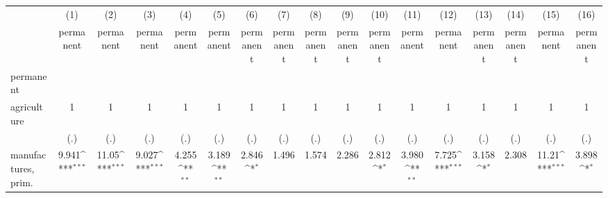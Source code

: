 {
\def\sym#1{\ifmmode^{#1}\else\(^{#1}\)\fi}
\begin{tabular}{l*{16}{c}}
\hline\hline
                    &\multicolumn{1}{c}{(1)}&\multicolumn{1}{c}{(2)}&\multicolumn{1}{c}{(3)}&\multicolumn{1}{c}{(4)}&\multicolumn{1}{c}{(5)}&\multicolumn{1}{c}{(6)}&\multicolumn{1}{c}{(7)}&\multicolumn{1}{c}{(8)}&\multicolumn{1}{c}{(9)}&\multicolumn{1}{c}{(10)}&\multicolumn{1}{c}{(11)}&\multicolumn{1}{c}{(12)}&\multicolumn{1}{c}{(13)}&\multicolumn{1}{c}{(14)}&\multicolumn{1}{c}{(15)}&\multicolumn{1}{c}{(16)}\\
                    &\multicolumn{1}{c}{permanent}&\multicolumn{1}{c}{permanent}&\multicolumn{1}{c}{permanent}&\multicolumn{1}{c}{permanent}&\multicolumn{1}{c}{permanent}&\multicolumn{1}{c}{permanent}&\multicolumn{1}{c}{permanent}&\multicolumn{1}{c}{permanent}&\multicolumn{1}{c}{permanent}&\multicolumn{1}{c}{permanent}&\multicolumn{1}{c}{permanent}&\multicolumn{1}{c}{permanent}&\multicolumn{1}{c}{permanent}&\multicolumn{1}{c}{permanent}&\multicolumn{1}{c}{permanent}&\multicolumn{1}{c}{permanent}\\
\hline
permanent           &                     &                     &                     &                     &                     &                     &                     &                     &                     &                     &                     &                     &                     &                     &                     &                     \\
agriculture         &           1         &           1         &           1         &           1         &           1         &           1         &           1         &           1         &           1         &           1         &           1         &           1         &           1         &           1         &           1         &           1         \\
                    &         (.)         &         (.)         &         (.)         &         (.)         &         (.)         &         (.)         &         (.)         &         (.)         &         (.)         &         (.)         &         (.)         &         (.)         &         (.)         &         (.)         &         (.)         &         (.)         \\
[1em]
manufactures, prim. &       9.941\sym{***}&       11.05\sym{***}&       9.027\sym{***}&       4.255\sym{**} &       3.189\sym{**} &       2.846\sym{*}  &       1.496         &       1.574         &       2.286         &       2.812\sym{*}  &       3.980\sym{**} &       7.725\sym{***}&       3.158\sym{*}  &       2.308         &       11.21\sym{***}&       3.898\sym{*}  \\

\end{tabular}}

